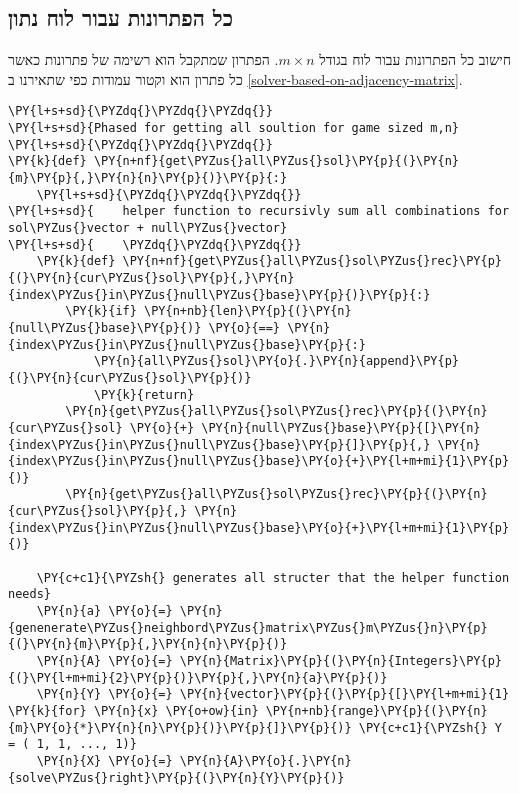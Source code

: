 \hypertarget{all-solution}{%
\subsection{כל הפתרונות עבור לוח נתון}\label{all-solution}}
חישוב כל הפתרונות עבור לוח בגודל
$m\times n$.
הפתרון שמתקבל הוא רשימה של פתרונות כאשר כל פתרון 
הוא וקטור עמודות כפי שתאירנו 
ב
\ref{solver-based-on-adjacency-matrix}.
\begin{english}
    \begin{tcolorbox}[breakable, size=fbox, boxrule=1pt, pad at break*=1mm,colback=cellbackground, colframe=cellborder]
\begin{Verbatim}[commandchars=\\\{\}]
\PY{l+s+sd}{\PYZdq{}\PYZdq{}\PYZdq{}}
\PY{l+s+sd}{Phased for getting all soultion for game sized m,n}
\PY{l+s+sd}{\PYZdq{}\PYZdq{}\PYZdq{}}
\PY{k}{def} \PY{n+nf}{get\PYZus{}all\PYZus{}sol}\PY{p}{(}\PY{n}{m}\PY{p}{,}\PY{n}{n}\PY{p}{)}\PY{p}{:}
    \PY{l+s+sd}{\PYZdq{}\PYZdq{}\PYZdq{}}
\PY{l+s+sd}{    helper function to recursivly sum all combinations for sol\PYZus{}vector + null\PYZus{}vector}
\PY{l+s+sd}{    \PYZdq{}\PYZdq{}\PYZdq{}} 
    \PY{k}{def} \PY{n+nf}{get\PYZus{}all\PYZus{}sol\PYZus{}rec}\PY{p}{(}\PY{n}{cur\PYZus{}sol}\PY{p}{,}\PY{n}{index\PYZus{}in\PYZus{}null\PYZus{}base}\PY{p}{)}\PY{p}{:}
        \PY{k}{if} \PY{n+nb}{len}\PY{p}{(}\PY{n}{null\PYZus{}base}\PY{p}{)} \PY{o}{==} \PY{n}{index\PYZus{}in\PYZus{}null\PYZus{}base}\PY{p}{:}
            \PY{n}{all\PYZus{}sol}\PY{o}{.}\PY{n}{append}\PY{p}{(}\PY{n}{cur\PYZus{}sol}\PY{p}{)}
            \PY{k}{return}
        \PY{n}{get\PYZus{}all\PYZus{}sol\PYZus{}rec}\PY{p}{(}\PY{n}{cur\PYZus{}sol} \PY{o}{+} \PY{n}{null\PYZus{}base}\PY{p}{[}\PY{n}{index\PYZus{}in\PYZus{}null\PYZus{}base}\PY{p}{]}\PY{p}{,} \PY{n}{index\PYZus{}in\PYZus{}null\PYZus{}base}\PY{o}{+}\PY{l+m+mi}{1}\PY{p}{)}
        \PY{n}{get\PYZus{}all\PYZus{}sol\PYZus{}rec}\PY{p}{(}\PY{n}{cur\PYZus{}sol}\PY{p}{,} \PY{n}{index\PYZus{}in\PYZus{}null\PYZus{}base}\PY{o}{+}\PY{l+m+mi}{1}\PY{p}{)}
    
    \PY{c+c1}{\PYZsh{} generates all structer that the helper function needs}
    \PY{n}{a} \PY{o}{=} \PY{n}{genenerate\PYZus{}neighbord\PYZus{}matrix\PYZus{}m\PYZus{}n}\PY{p}{(}\PY{n}{m}\PY{p}{,}\PY{n}{n}\PY{p}{)}
    \PY{n}{A} \PY{o}{=} \PY{n}{Matrix}\PY{p}{(}\PY{n}{Integers}\PY{p}{(}\PY{l+m+mi}{2}\PY{p}{)}\PY{p}{,}\PY{n}{a}\PY{p}{)}
    \PY{n}{Y} \PY{o}{=} \PY{n}{vector}\PY{p}{(}\PY{p}{[}\PY{l+m+mi}{1} \PY{k}{for} \PY{n}{x} \PY{o+ow}{in} \PY{n+nb}{range}\PY{p}{(}\PY{n}{m}\PY{o}{*}\PY{n}{n}\PY{p}{)}\PY{p}{]}\PY{p}{)} \PY{c+c1}{\PYZsh{} Y = ( 1, 1, ..., 1)}
    \PY{n}{X} \PY{o}{=} \PY{n}{A}\PY{o}{.}\PY{n}{solve\PYZus{}right}\PY{p}{(}\PY{n}{Y}\PY{p}{)}


\end{Verbatim}
\end{tcolorbox}
\end{english}
